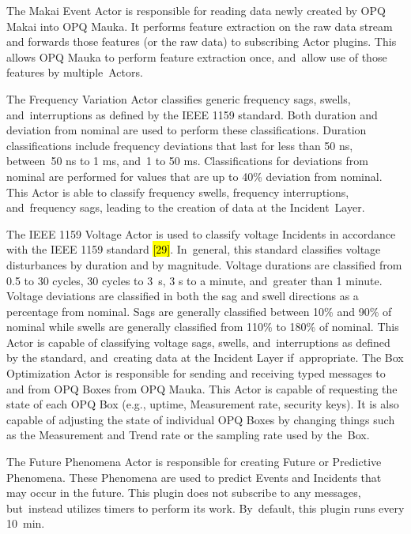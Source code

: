 \documentclass[energies,article,accept,moreauthors,pdftex]{Definitions/mdpi}
\begin{document}
 The Makai Event Actor is responsible for reading data newly created by OPQ Makai into OPQ Mauka. It performs feature extraction on the raw data stream and forwards those features (or the raw data) to subscribing Actor plugins. This allows OPQ Mauka to perform feature extraction once, and~allow use of those features by multiple~Actors.

 The Frequency Variation Actor classifies generic frequency sags, swells, and~interruptions as defined by the IEEE 1159 standard. Both duration and deviation from nominal are used to perform these classifications. Duration classifications include frequency deviations that last for less than 50 ns, between~50 ns to 1 ms, and~1 to 50 ms. Classifications for deviations from nominal are performed for values that are up to 40\% deviation from nominal. This Actor is able to classify frequency swells, frequency interruptions, and~frequency sags, leading to the creation of data at the Incident~Layer.

 The IEEE 1159 Voltage Actor is used to classify voltage Incidents in accordance with the IEEE 1159 standard \hl{[29]}. In~general, this standard classifies voltage disturbances by duration and by magnitude. Voltage durations are classified from 0.5 to 30 cycles, 30 cycles to 3~s, 3 s to a minute, and~greater than 1 minute. Voltage deviations are classified in both the sag and swell directions as a percentage from nominal. Sags are generally classified between 10\% and 90\% of nominal while swells are generally classified from 110\% to 180\% of nominal. This Actor is capable of classifying voltage sags, swells, and~interruptions as defined by the standard, and~creating data at the Incident Layer if~appropriate.
 The Box Optimization Actor is responsible for sending and receiving typed messages to and from OPQ Boxes from OPQ Mauka. This Actor is capable of requesting the state of each OPQ Box (e.g., uptime, Measurement rate, security keys). It is also capable of adjusting the state of individual OPQ Boxes by changing things such as the Measurement and Trend rate or the sampling rate used by the~Box.

 The Future Phenomena Actor is responsible for creating Future or Predictive Phenomena. These Phenomena are used to predict Events and Incidents that may occur in the future. This plugin does not subscribe to any messages, but~instead utilizes timers to perform its work. By~default, this plugin runs every 10~min.
\end{document}
